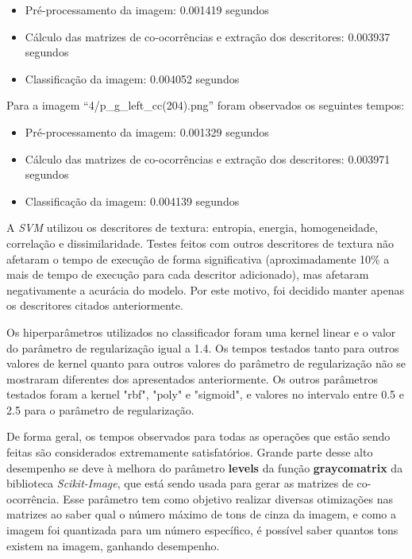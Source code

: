 \begin{itemize}
    \item Pré-processamento da imagem: 0.001419 segundos
    \item Cálculo das matrizes de co-ocorrências e extração dos descritores: 0.003937 segundos
    \item Classificação da imagem: 0.004052 segundos
\end{itemize}


\noindent
Para a imagem “4/p\_g\_left\_cc(204).png” foram observados os seguintes tempos:

\begin{itemize}
    \item Pré-processamento da imagem: 0.001329 segundos
    \item Cálculo das matrizes de co-ocorrências e extração dos descritores: 0.003971 segundos
    \item Classificação da imagem: 0.004139 segundos
\end{itemize}

A \emph{SVM} utilizou os descritores de textura: entropia, energia, homogeneidade, correlação e dissimilaridade. Testes feitos com outros descritores
de textura não afetaram o tempo de execução de forma significativa (aproximadamente 10\% a mais de tempo de execução para cada descritor adicionado),
mas afetaram negativamente a acurácia do modelo. Por este motivo, foi decidido manter apenas os descritores citados anteriormente.

Os hiperparâmetros utilizados no classificador foram uma kernel linear e o valor do parâmetro de regularização igual a 1.4. Os tempos 
testados tanto para outros valores de kernel quanto para outros valores do parâmetro de regularização não se mostraram diferentes dos 
apresentados anteriormente. Os outros parâmetros testados foram a kernel "rbf", "poly" e "sigmoid", e valores no intervalo entre 0.5 e 2.5 para 
o parâmetro de regularização.

De forma geral, os tempos observados para todas as operações que estão sendo feitas são 
considerados extremamente satisfatórios. Grande parte desse alto desempenho se deve à 
melhora do parâmetro \textbf{levels} da função \textbf{graycomatrix} da biblioteca \emph{Scikit-Image}, 
que está sendo usada para gerar as matrizes de co-ocorrência. Esse parâmetro tem como 
objetivo realizar diversas otimizações nas matrizes ao saber qual o número máximo de 
tons de cinza da imagem, e como a imagem foi quantizada para um número específico, é 
possível saber quantos tons existem na imagem, ganhando desempenho.
